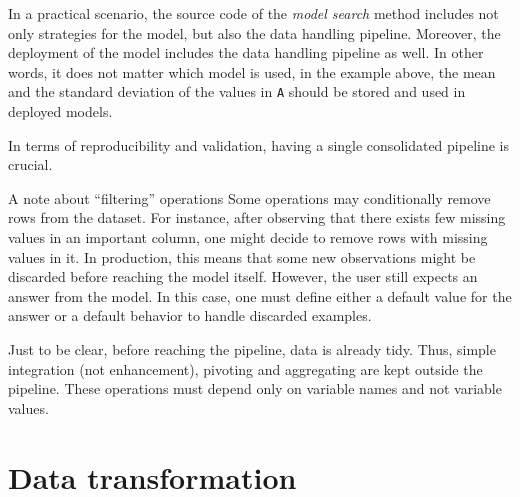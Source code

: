In a practical scenario, the source code of the \emph{model search} method includes not
only strategies for the model, but also the data handling pipeline.  Moreover, the deployment
of the model includes the data handling pipeline as well.  In other words, it does not
matter which model is used, in the example above, the mean and the standard deviation of
the values in \texttt{A} should be stored and used in deployed models.

In terms of reproducibility and validation, having a single consolidated pipeline is
crucial.

\begin{hlbox}{A note about ``filtering'' operations}
  Some operations may conditionally remove rows from the dataset.  For instance, after
  observing that there exists few missing values in an important column, one might decide
  to remove rows with missing values in it.  In production, this means that some new
  observations might be discarded before reaching the model itself.  However, the user
  still expects an answer from the model.  In this case, one must define either a default
  value for the answer or a default behavior to handle discarded examples.
\end{hlbox}


Just to be clear, before reaching the pipeline, data is already tidy.  Thus, simple
integration (not enhancement), pivoting and aggregating are kept outside the pipeline.
These operations must depend only on variable names and not variable values.

\section{Data transformation}

